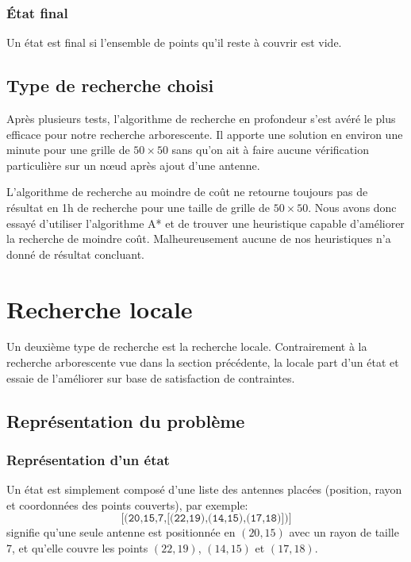 \documentclass[12pt]{article}
\begin{document}
\subsubsection{État final}
Un état est final si l'ensemble de points qu'il reste à couvrir est vide.


\subsection{Type de recherche choisi}
Après plusieurs tests, l'algorithme de recherche en profondeur s'est avéré le plus efficace pour notre recherche arborescente. Il apporte une solution en environ une minute pour une grille de $50 \times 50$ sans qu'on ait à faire aucune vérification particulière sur un n\oe ud après ajout d'une antenne. 

L'algorithme de recherche au moindre de coût ne retourne toujours pas de résultat en 1h de recherche pour une taille de grille de $50 \times 50$.
Nous avons donc essayé d'utiliser l'algorithme A* et de trouver une heuristique capable d'améliorer la recherche de moindre coût. Malheureusement aucune de nos heuristiques n'a donné de résultat concluant.



%
%


\section{Recherche locale}
Un deuxième type de recherche est la recherche locale. Contrairement à la recherche arborescente vue dans la section précédente, la locale part d'un état et essaie de l'améliorer sur base de satisfaction de contraintes.

\subsection{Représentation du problème}
\subsubsection{Représentation d'un état}
Un état est simplement composé d'une liste des antennes placées (position, rayon et coordonnées des points couverts), par exemple:
\begin{equation*}
	\texttt{[(20,15,7,[(22,19),(14,15),(17,18)])]}
\end{equation*}
signifie qu'une seule antenne est positionnée en $(20,15)$ avec un rayon de taille 7, et qu'elle couvre les points $(22,19)$, $(14,15)$ et $(17,18)$.
\end{document}
